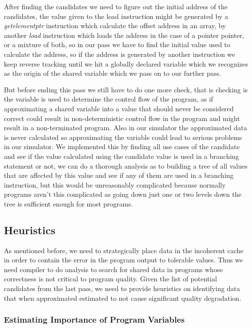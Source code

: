 \documentclass[12pt,conference]{IEEEtran}
\begin{document}
After finding the candidates we need to figure out the initial address of
the candidates, the value given to the load instruction might be generated
by a \textit{getelementptr} instruction which calculate the offset address
in an array, by another \textit{load} instruction which loads the address 
in the case of a pointer pointer, or a mixture of both, so in our pass we 
have to find the initial value used to calculate the address, so if the 
address is generated by another instruction we keep reverse tracking until 
we hit a globally declared variable which we recognizes as the origin of the
shared variable which we pass on to our further pass.

But before ending this pass we still have to do one more check, that is 
checking is the variable is used to determine the control flow of the
program, as if approximating a shared variable into a value that should
never be considered correct could result in non-deterministic control 
flow in the program and might result in a non-terminated program. Also
in our simulator the approximated data is never calculated so 
approximating the variable could lead to serious problems in our
simulator. We implemented this by finding all use cases of the candidate
and see if the value calculated using the candidate value is used in 
a branching statement or not, we can do a thorough analysis as to building
a tree of all values that are affected by this value and see if any of
them are used in a branching instruction, but this would be unreasonably
complicated because normally programs aren't this complicated as going down
just one or two levels down the tree is sufficient enough for most programs.

\subsection{Heuristics}

As mentioned before, we need to strategically place data
in the incoherent cache in order to contain the error in the 
program output to tolerable values. Thus we need compiler to do analysis 
to search for shared data in programs whose correctness is not critical to 
program quality. Given the list of potential candidates from the last
pass, we need to provide heuristics on identifying data that when
approximated estimated to not cause significant quality degradation.

\subsubsection{Estimating Importance of Program Variables}
\end{document}

